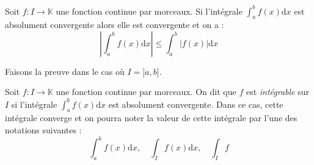 \documentclass[french,11pt,twoside]{VcCours}
\newcommand{\dx}{\text{d}x}
\newcommand{\dt}{\text{d}t}
\begin{document}
\begin{Proposition}{} Soit $f : I \rightarrow \mathbb{K}$ une fonction continue par morceaux. Si l'intégrale $\int_{a}^b f(x) \dx$ est absolument convergente alors elle est convergente et on a :
$$ \left\vert \int_{a}^b  f(x)  \dx \right\vert \leq \int_{a}^b \vert f(x) \vert \dx $$
\end{Proposition}

\begin{Demonstration}{} Faisons la preuve dans le cas où $I = ]a,b]$. 

%
%


\vspace{11cm}
\end{Demonstration}

\begin{Definition}{} Soit $f : I \rightarrow \mathbb{K}$ une fonction continue par morceaux. On dit que $f$ est \emph{intégrable} sur $I$ si l'intégrale $\int_{a}^b f(x) \dx$ est absolument convergente. Dans ce cas, cette intégrale converge et on pourra noter la valeur de cette intégrale par l'une des notations suivantes :
$$ \int_{a}^b f(x) \dx, \quad \int_{I} f(x) \dx, \quad \int_I f$$
\end{Definition}
\end{document}
